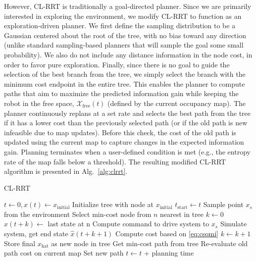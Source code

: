 However, CL-RRT is traditionally a goal-directed planner. Since we are primarily interested in exploring the environment, we modify CL-RRT to function as an exploration-driven planner. We first define the sampling distribution to be a Gaussian centered about the root of the tree, with no bias toward any direction (unlike standard sampling-based planners that will sample the goal some small probability). We also do not include any distance information in the node cost, in order to favor pure exploration. Finally, since there is no goal to guide the selection of the best branch from the tree, we simply select the branch with the minimum cost endpoint in the entire tree. This enables the planner to compute paths that aim to maximize the predicted information gain while keeping the robot in the free space, $\mathcal{X}_\text{free}(t)$ (defined by the current occupancy map). The planner continuously replans at a set rate and selects the best path from the tree if it has a lower cost than the previously selected path (or if the old path is new infeasible due to map updates). Before this check, the cost of the old path is updated using the current map to capture changes in the expected information gain. Planning terminates when a user-defined condition is met (e.g., the entropy rate of the map falls below a threshold). The resulting modified CL-RRT algorithm is presented in Alg.~\ref{alg:clrrt}.

\begin{algorithm} [t]
\caption{CL-RRT}
\label{alg:clrrt}
\begin{algorithmic}[1]
\State $t \gets 0, x(t) \gets x_\text{initial}$
\State Initialize tree with node at $x_\text{initial}$
\State $t_\text{start} \gets t$
\State Sample point $x_s$ from the environment
\State Select min-cost node from $n$ nearest in tree
\State $k \gets 0$
\State $\hat{x}(t+k) \gets $ last state at n
	\State Compute command to drive system to $x_s$
	\State Simulate system, get end state $\hat{x}(t+k+1)$
	\State Compute cost based on \eqref{eq:csqmi}
	\State $k \gets k+1$
\EndWhile
\State Store final $x_\text{hat}$ as new node in tree
\EndFor
\State Get min-cost path from tree
\State Re-evaluate old path cost on current map
\State Set new path
\EndIf
\State $t \gets t$ + planning time
\EndWhile
\end{algorithmic}
\end{algorithm}
